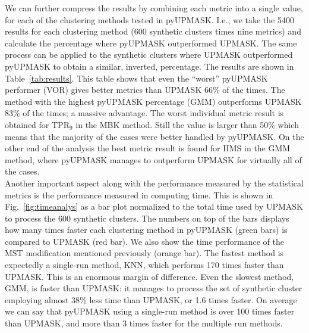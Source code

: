 \documentclass[draft]{aa}
\begin{document}
 We can further compress the results by combining each metric into a single
 value, for each of the clustering methods tested in pyUPMASK. I.e., we take
 the 5400 results for each clustering method (600 synthetic clusters times nine
 metrics) and calculate the percentage where pyUPMASK outperformed UPMASK.
 The same process can be applied to the synthetic clusters where
 UPMASK outperformed pyUPMASK to obtain a similar, inverted, percentage.
 The results are shown in Table~\ref{tab:results}.
 This table shows that even the ``worst'' pyUPMASK performer (VOR) gives
 better metrics than UPMASK 66\% of the times. The method  with the highest
 pyUPMASK percentage (GMM) outperforms UPMASK 83\% of the times; a massive
 advantage. The worst individual metric result is obtained for TPR$_9$ in the
 MBK method. Still the value is larger than 50\% which means that the majority
 of the cases were better handled by pyUPMASK. On the other end of the
 analysis the best metric result is found for HMS in the GMM method, where
 pyUPMASK manages to outperform UPMASK for virtually all of the cases.\\


 Another important aspect along with the performance measured by the
 statistical metrics is the performance measured in computing time. This is
 shown in Fig.~\ref{fig:timeanalys} as a bar plot normalized to the total time
 used by UPMASK to process the 600 synthetic clusters. The numbers on top of
 the bars displays how many times faster each clustering method in pyUPMASK
 (green bars) is compared to UPMASK (red bar). We also show the time
 performance of the MST modification mentioned previously (orange bar).
 The fastest method is expectedly a single-run method, KNN,
 which performs 170 times faster than UPMASK. This is an enormous margin of
 difference. Even the slowest method, GMM, is faster than UPMASK: it manages to
 process the set of synthetic cluster employing almost 38\% less time than
 UPMASK, or 1.6 times faster. On average we can say that pyUPMASK using a
 single-run method is over 100 times faster than UPMASK, and more than 3 times
 faster for the multiple run methods.\\
\end{document}
